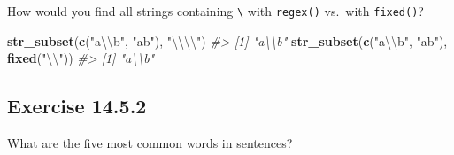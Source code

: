 \documentclass[]{book}
\newenvironment{Shaded}{\begin{snugshade}}{\end{snugshade}}
\newcommand{\CharTok}[1]{\textcolor[rgb]{0.31,0.60,0.02}{#1}}
\newcommand{\CommentTok}[1]{\textcolor[rgb]{0.56,0.35,0.01}{\textit{#1}}}
\newcommand{\DataTypeTok}[1]{\textcolor[rgb]{0.13,0.29,0.53}{#1}}
\newcommand{\DecValTok}[1]{\textcolor[rgb]{0.00,0.00,0.81}{#1}}
\newcommand{\KeywordTok}[1]{\textcolor[rgb]{0.13,0.29,0.53}{\textbf{#1}}}
\newcommand{\NormalTok}[1]{#1}
\newcommand{\OperatorTok}[1]{\textcolor[rgb]{0.81,0.36,0.00}{\textbf{#1}}}
\newcommand{\OtherTok}[1]{\textcolor[rgb]{0.56,0.35,0.01}{#1}}
\newcommand{\StringTok}[1]{\textcolor[rgb]{0.31,0.60,0.02}{#1}}
\theoremstyle{plain}
\theoremstyle{remark}
\theoremstyle{definition}
\theoremstyle{definition}
\theoremstyle{definition}
\theoremstyle{remark}
\begin{document}
How would you find all strings containing \texttt{\textbackslash{}} with
\texttt{regex()} vs.~with \texttt{fixed()}?

\begin{Shaded}
\begin{Highlighting}[]
\KeywordTok{str_subset}\NormalTok{(}\KeywordTok{c}\NormalTok{(}\StringTok{"a}\CharTok{\textbackslash{}\textbackslash{}}\StringTok{b"}\NormalTok{, }\StringTok{"ab"}\NormalTok{), }\StringTok{"}\CharTok{\textbackslash{}\textbackslash{}\textbackslash{}\textbackslash{}}\StringTok{"}\NormalTok{)}
\CommentTok{#> [1] "a\textbackslash{}\textbackslash{}b"}
\KeywordTok{str_subset}\NormalTok{(}\KeywordTok{c}\NormalTok{(}\StringTok{"a}\CharTok{\textbackslash{}\textbackslash{}}\StringTok{b"}\NormalTok{, }\StringTok{"ab"}\NormalTok{), }\KeywordTok{fixed}\NormalTok{(}\StringTok{"}\CharTok{\textbackslash{}\textbackslash{}}\StringTok{"}\NormalTok{))}
\CommentTok{#> [1] "a\textbackslash{}\textbackslash{}b"}
\end{Highlighting}
\end{Shaded}

\hypertarget{exercise-14.5.2}{%
\subsection*{\texorpdfstring{Exercise
{14.5.2}}{Exercise 14.5.2}}\label{exercise-14.5.2}}

What are the five most common words in sentences?

\begin{Shaded}
\end{Shaded}
\end{document}
